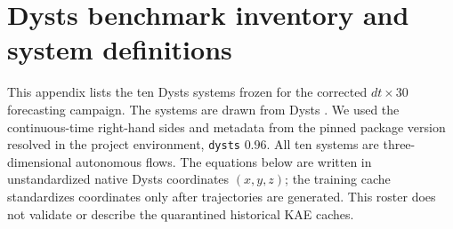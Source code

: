 \section{Dysts benchmark inventory and system definitions}
\label{app:dysts_inventory_full}

This appendix lists the ten Dysts systems frozen for the corrected
\(dt{\times}30\) forecasting campaign. The systems are drawn from Dysts
\citep{gilpin_chaos_2021,gilpin_model_2023}. We used the continuous-time
right-hand sides and metadata from the pinned package version resolved in the
project environment, \texttt{dysts} \(0.96\). All ten systems are
three-dimensional autonomous flows. The equations below are written in
unstandardized native Dysts coordinates \((x,y,z)\); the training cache
standardizes coordinates only after trajectories are generated. This roster
does not validate or describe the quarantined historical KAE caches.

\begin{table}[tbp]
\centering
\caption{The ten-system roster and target observation grid for the corrected
Dysts \(dt{\times}30\) campaign. The ``target stored step'' is \(30\) times
the native Dysts integration interval and does not describe the quarantined
historical KAE caches. The final column gives the hand-specified diagnostic
structure count used only to size the BD and SB transition parameterizations;
it is a heuristic lobe, scroll, or equilibrium count, not basin truth.}
\label{tab:dysts_inventory_full}
\end{table}

